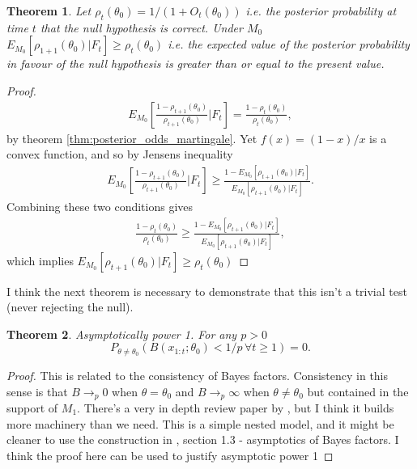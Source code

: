 \documentclass[11pt]{article}
\newtheorem{thm}{Theorem}[section]
\begin{document}
\begin{thm} Let $\rho_t(\theta_0) = 1/(1+O_t(\theta_0))$ i.e. the posterior probability at time $t$ that the null hypothesis is correct. Under $M_0$ $E_{M_0}[\rho_{1+1}(\theta_0)|F_t] \geq \rho_{t}(\theta_0)$ i.e. the expected value of the posterior probability in favour of the null hypothesis is greater than or equal to the present value.
\end{thm}

\begin{proof}
  \begin{align}
      E_{M_0}\left[\frac{1-\rho_{t+1}(\theta_0)}{\rho_{t+1}(\theta_0)} | F_t \right] = \frac{1-\rho_{t}(\theta_0)}{\rho_{t}(\theta_0)},
  \end{align}
  by theorem \ref{thm:posterior_odds_martingale}. Yet $f(x)=(1-x)/x$ is a convex function, and so by Jensens inequality
    \begin{align}
      E_{M_0}\left[\frac{1-\rho_{t+1}(\theta_0)}{\rho_{t+1}(\theta_0)} | F_t \right] \geq \frac{1-E_{M_0}[\rho_{t+1}(\theta_0)|F_t]}{E_{M_0}[\rho_{t+1}(\theta_0)|F_t]}.
    \end{align}
    Combining these two conditions gives
    \begin{align}
       \frac{1-\rho_{t}(\theta_0)}{\rho_{t}(\theta_0)} \geq \frac{1-E_{M_0}[\rho_{t+1}(\theta_0)|F_t]}{E_{M_0}[\rho_{t+1}(\theta_0)|F_t]},
    \end{align}
    which implies $E_{M_0}[\rho_{t+1}(\theta_0)|F_t] \geq \rho_{t}(\theta_0)$ 
\end{proof}

I think the next theorem is necessary to demonstrate that this isn't a trivial test (never rejecting the null).
  \begin{thm}
  Asymptotically power 1. For any $p>0$
 \begin{equation} 
  P_{\theta \neq \theta_0}\left(B(x_{1:t};\theta_0) < 1/p \, \forall t \geq 1\right) = 0.
  \end{equation}
\end{thm}
\begin{proof}
  This is related to the consistency of Bayes factors. Consistency in this sense is that $B\rightarrow_p 0$ when $\theta=\theta_0$ and $B\rightarrow_p \infty$ when $\theta\neq \theta_0$ but contained in the support of $M_1$. There's a very in depth review paper by \cite{chib_bf_consistency}, but I think it builds more machinery than we need. This is a simple nested model, and it might be cleaner to use the construction in \cite{fractional_bf}, section 1.3 - asymptotics of Bayes factors. I think the proof here can be used to justify asymptotic power 1
\end{proof}
\end{document}
